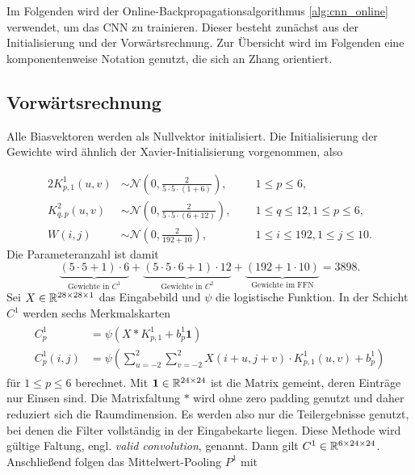 Im Folgenden wird der Online-Backpropagationsalgorithmus \ref{alg:cnn_online} verwendet, um das CNN zu trainieren. Dieser besteht zunächst aus der Initialisierung und der Vorwärtsrechnung. Zur Übersicht wird im Folgenden eine komponentenweise Notation genutzt, die sich an Zhang \cite{key} orientiert. 

\subsection*{Vorwärtsrechnung}
Alle Biasvektoren werden als Nullvektor initialisiert. Die Initialisierung der Gewichte wird ähnlich der Xavier-Initialisierung \cite{DBLP:journals/jmlr/GlorotB10} vorgenommen, also

\begin{alignat*}{2}
    K^{1}_{p,1}(u,v) &\sim  \mathcal{N} \left(0, \frac{2}{5 \cdot 5 \cdot (1+6)}\right), \; \; && 1 \leq p \leq 6,\\
    K^{2}_{q,p}(u,v) &\sim  \mathcal{N} \left(0, \frac{2}{5 \cdot 5 \cdot (6+12)}\right),\; \; && 1 \leq q \leq 12, 1 \leq p \leq 6,\\
    W(i,j) &\sim \mathcal{N} \left(0, \frac{2}{192+10}\right), \; \; &&1 \leq i \leq 192 , 1 \leq j \leq 10.
\end{alignat*}
Die Parameteranzahl ist damit 
\begin{equation*}
    \underbrace{(5 \cdot 5 +1) \cdot 6}_{\text{Gewichte in $C^1$}}+\underbrace{(5 \cdot 5 \cdot 6+1) \cdot 12}_{\text{Gewichte in $C^2$}}+\underbrace{(192+1 \cdot 10)}_{\text{Gewichte im FFN}}=3898.
\end{equation*}
 Sei $X \in \mathbb{R}^{28 \times 28 \times 1}$ das Eingabebild und $\psi$ die logistische Funktion. In der Schicht $C^1$ werden sechs Merkmalskarten 
\begin{align*}
    \label{eq:C1_forw}
    \begin{split}
    C_p^1 &= \psi(X \ast K_{p,1}^1+b_p^1 \mathbf{1}) \\
    C_p^1(i,j)&=\psi \left(\sum_{u=-2}^2 \sum_{v=-2}^2 X(i+u,j+v) \cdot K_{p,1}^1(u,v) +b_p^1\right)
    \end{split}
\end{align*}
für $1 \leq p \leq 6$ berechnet. Mit $\mathbf{1} \in \mathbb{R}^{24 \times 24}$ ist die Matrix gemeint, deren Einträge nur Einsen sind. Die Matrixfaltung $\ast$ wird ohne zero padding genutzt und daher reduziert sich die Raumdimension. Es werden also nur die Teilergebnisse genutzt, bei denen die Filter vollständig in der Eingabekarte liegen. Diese Methode wird gültige Faltung, engl. \textit{valid convolution}, genannt. Dann gilt $C^1 \in \mathbb{R}^{6 \times 24 \times 24}$. Anschließend folgen das Mittelwert-Pooling $P^1$ mit
